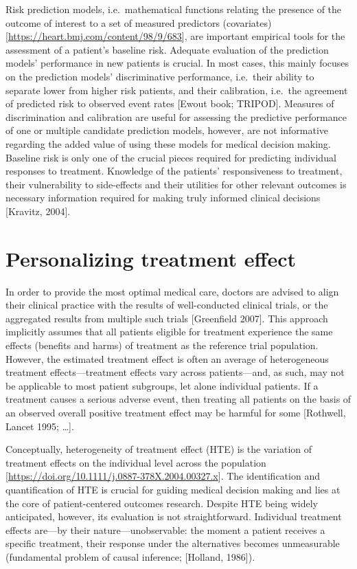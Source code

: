 \documentclass[
]{book}
\begin{document}
Risk prediction models, i.e.~mathematical functions relating the presence of the
outcome of interest to a set of measured predictors (covariates)
{[}\url{https://heart.bmj.com/content/98/9/683}{]}, are important empirical tools for the
assessment of a patient's baseline risk. Adequate evaluation of the prediction
models' performance in new patients is crucial. In most cases, this mainly
focuses on the prediction models' discriminative performance, i.e.~their ability
to separate lower from higher risk patients, and their calibration, i.e.~the
agreement of predicted risk to observed event rates {[}Ewout book;
TRIPOD{]}. Measures of discrimination and calibration are useful for assessing the
predictive performance of one or multiple candidate prediction models, however,
are not informative regarding the added value of using these models for medical
decision making. Baseline risk is only one of the crucial pieces required for
predicting individual responses to treatment. Knowledge of the patients'
responsiveness to treatment, their vulnerability to side-effects and their
utilities for other relevant outcomes is necessary information required for
making truly informed clinical decisions {[}Kravitz, 2004{]}.

\hypertarget{personalizing-treatment-effect}{%
\section{Personalizing treatment effect}\label{personalizing-treatment-effect}}

In order to provide the most optimal medical care, doctors are advised to align
their clinical practice with the results of well-conducted clinical trials, or
the aggregated results from multiple such trials {[}Greenfield 2007{]}. This
approach implicitly assumes that all patients eligible for treatment experience
the same effects (benefits and harms) of treatment as the reference trial
population. However, the estimated treatment effect is often an average of
heterogeneous treatment effects---treatment effects vary across patients---and,
as such, may not be applicable to most patient subgroups, let alone individual
patients. If a treatment causes a serious adverse event, then treating all
patients on the basis of an observed overall positive treatment effect may be
harmful for some {[}Rothwell, Lancet 1995; \ldots{]}.

Conceptually, heterogeneity of treatment effect (HTE) is the variation of
treatment effects on the individual level across the population
{[}\url{https://doi.org/10.1111/j.0887-378X.2004.00327.x}{]}. The identification and
quantification of HTE is crucial for guiding medical decision making and lies at the
core of patient-centered outcomes research. Despite HTE being widely
anticipated, however, its evaluation is not straightforward. Individual
treatment effects are---by their nature---unobservable: the moment a patient
receives a specific treatment, their response under the alternatives becomes
unmeasurable (fundamental problem of causal inference; {[}Holland, 1986{]}).
\end{document}
